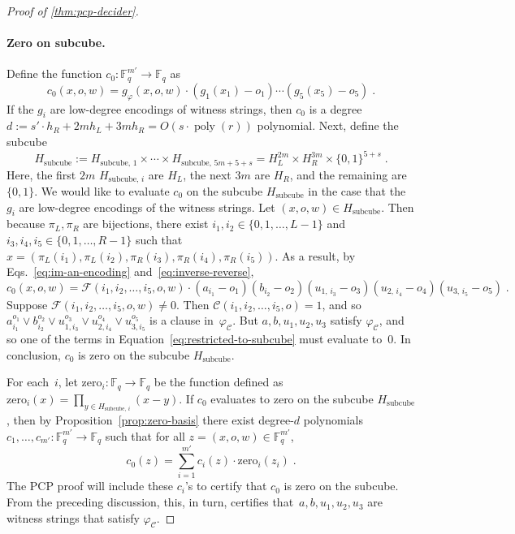 \documentclass[11pt]{article}
\theoremstyle{definition}
\newcommand{\F}{\ensuremath{\mathbb{F}}}
\DeclareMathOperator{\poly}{poly}
\newcommand{\circuit}{\mathcal{C}}
\newcommand{\formula}{\mathcal{F}}
\begin{document}
\begin{proof}[Proof of \cref{thm:pcp-decider}]
  \paragraph{Zero on subcube.}
  Define the function $c_0:\F_q^{m'} \rightarrow \F_q$ as
  \begin{equation*}
    c_0(x, o, w) = g_\varphi(x, o, w)
    \cdot (g_1(x_1) - o_1) \cdots (g_5(x_5)- o_5)\;.
  \end{equation*}
  If the $g_i$ are low-degree encodings of witness strings, then $c_0$ is a 
  degree $d:= s'\cdot h_R + 2 mh_L + 3mh_R = O(s \cdot \poly(r))$ polynomial.
  Next, define the subcube
  \begin{equation*}
    H_{\mathrm{subcube}} := H_{\mathrm{subcube},\, 1} \times
    \cdots \times H_{\mathrm{subcube},\, 5m + 5 + s}
    = H_L^{2m} \times H_R^{3m} \times \{0, 1\}^{5+s}\;.
  \end{equation*}
  Here, the first $2m$ $H_{\mathrm{subcube},\,i}$ are $H_L$, the next $3m$ are
  $H_R$, and the remaining are $\{0, 1\}$.
  We would like to evaluate $c_0$ on the subcube $H_{\mathrm{subcube}}$ in the
  case that the $g_i$ are low-degree encodings of the witness strings.
  Let $(x, o, w) \in H_{\mathrm{subcube}}$.
  Then because $\pi_L, \pi_R$ are bijections, there exist $i_1, i_2 \in \{0, 1,
  \ldots, L-1\}$ and $i_3, i_4, i_5 \in \{0, 1, \ldots, R-1\}$ such that $x =
  (\pi_L(i_1), \pi_L(i_2), \pi_R(i_3), \pi_R(i_4), \pi_R(i_5))$.
  As a result, by Eqs.~\eqref{eq:im-an-encoding} and~\eqref{eq:inverse-reverse},
  \begin{equation}\label{eq:restricted-to-subcube}
    c_0(x, o, w) = \formula(i_1, i_2, \ldots, i_5, o, w) \cdot (a_{i_1} - o_1)
    (b_{i_2} - o_2)(u_{1,\, i_3} - o_3)(u_{2,\, i_4} - o_4)(u_{3,\, i_5} - o_5)\;.
  \end{equation}
  Suppose $\formula(i_1, i_2, \ldots,i_5, o, w) \neq 0$.
  Then $\circuit(i_1, i_2, \ldots, i_5, o) = 1$, and so
  $a_{i_1}^{o_1} \lor b_{i_2}^{o_2} \lor u_{1, i_3}^{o_3} \lor u_{2,
    i_4}^{o_4} \lor u_{3, i_5}^{o_5}$ is a clause in~$\varphi_\circuit$.
  But $a, b, u_1, u_2, u_3$ satisfy $\varphi_\circuit$, and so one of the
  terms in Equation~\eqref{eq:restricted-to-subcube} must evaluate to~$0$.
  In conclusion, $c_0$ is zero on the subcube $H_{\mathrm{subcube}}$.

  For each~$i$, let $\mathrm{zero}_i : \F_q \rightarrow \F_q$ be the function
  defined as $\mathrm{zero}_i(x) = \prod_{y \in H_{\mathrm{subcube},\, i}}(x-y)$.
  If $c_0$ evaluates to zero on the subcube $H_{\mathrm{subcube}}$, then by
  Proposition~\ref{prop:zero-basis}
  there exist degree-$d$ polynomials $c_1, \ldots, c_{m'}:\F_q^{m'}\rightarrow
  \F_q$ such that for all $z = (x, o, w) \in \F_q^{m'}$,
  \begin{equation*}
    c_0(z) = \sum_{i=1}^{m'} c_i(z)\cdot \mathrm{zero}_i(z_i)\;.
  \end{equation*}
  The PCP proof will include these $c_i$'s to certify that $c_0$ is zero on the
  subcube.
  From the preceding discussion, this, in turn, certifies that~$a, b, u_1, u_2,
  u_3$ are witness strings that satisfy $\varphi_\circuit$.


\end{proof}
\end{document}
